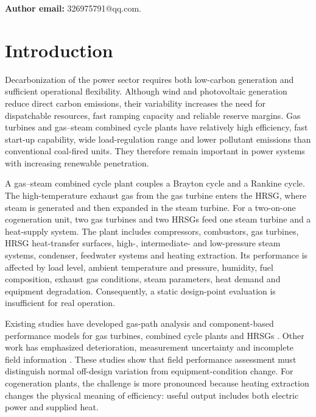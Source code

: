 \documentclass[12pt,a4paper]{article}
\begin{document}
\vspace{0.5em}
\noindent\textbf{Author email:} 326975791@qq.com.

\section{Introduction}

Decarbonization of the power sector requires both low-carbon generation and sufficient operational flexibility. Although wind and photovoltaic generation reduce direct carbon emissions, their variability increases the need for dispatchable resources, fast ramping capacity and reliable reserve margins. Gas turbines and gas--steam combined cycle plants have relatively high efficiency, fast start-up capability, wide load-regulation range and lower pollutant emissions than conventional coal-fired units. They therefore remain important in power systems with increasing renewable penetration.

A gas--steam combined cycle plant couples a Brayton cycle and a Rankine cycle. The high-temperature exhaust gas from the gas turbine enters the HRSG, where steam is generated and then expanded in the steam turbine. For a two-on-one cogeneration unit, two gas turbines and two HRSGs feed one steam turbine and a heat-supply system. The plant includes compressors, combustors, gas turbines, HRSG heat-transfer surfaces, high-, intermediate- and low-pressure steam systems, condenser, feedwater systems and heating extraction. Its performance is affected by load level, ambient temperature and pressure, humidity, fuel composition, exhaust gas conditions, steam parameters, heat demand and equipment degradation. Consequently, a static design-point evaluation is insufficient for real operation.

Existing studies have developed gas-path analysis and component-based performance models for gas turbines, combined cycle plants and HRSGs \cite{urban1973gpa,stamatis2011gpa,tahan2017health,hanachi2018survey,kim2004partload,hyun2018dual,yang2019inlet}. Other work has emphasized deterioration, measurement uncertainty and incomplete field information \cite{diakunchak1992deterioration,kurz2001degradation,li2009prognostic,pinelli2000uncertainties,carstens2018uncertainty}. These studies show that field performance assessment must distinguish normal off-design variation from equipment-condition change. For cogeneration plants, the challenge is more pronounced because heating extraction changes the physical meaning of efficiency: useful output includes both electric power and supplied heat.
\end{document}
